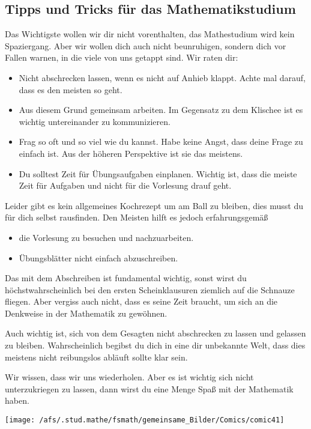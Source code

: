 \subsection{Tipps und Tricks für das Mathematikstudium}
Das Wichtigste wollen wir dir nicht vorenthalten,
das Mathestudium wird kein Spaziergang.
Aber wir wollen dich auch nicht beunruhigen,
sondern dich vor Fallen warnen, in die viele von uns getappt sind.
Wir raten dir:
\begin{itemize}
\item
Nicht abschrecken lassen, wenn es nicht auf Anhieb klappt.
Achte mal darauf, dass es den meisten so geht.

\item
Aus diesem Grund gemeinsam arbeiten.
Im Gegensatz zu dem Klischee ist es wichtig untereinander zu kommunizieren.

\item
Frag so oft und so viel wie du kannst.
Habe keine Angst, dass deine Frage zu einfach ist.
Aus der höheren Perspektive ist sie das meistens.

\item
Du solltest Zeit für Übungsaufgaben einplanen.
Wichtig ist, dass die meiste Zeit für Aufgaben und nicht für die
Vorlesung drauf geht.
\end{itemize}
Leider gibt es kein allgemeines Kochrezept um am Ball zu bleiben,
dies musst du für dich selbst rausfinden.
Den Meisten hilft es jedoch erfahrungsgemäß
\begin{itemize}
\item
die Vorlesung zu besuchen und nachzuarbeiten.
\item
Übungsblätter nicht einfach abzuschreiben.
\end{itemize}
Das mit dem Abschreiben ist fundamental wichtig,
sonst wirst du höchstwahrscheinlich bei den ersten Scheinklausuren
ziemlich auf die Schnauze fliegen.
Aber vergiss auch nicht,
dass es seine Zeit braucht,
um sich an die Denkweise in der Mathematik zu gewöhnen.

Auch wichtig ist,
sich von dem Gesagten nicht abschrecken zu lassen und gelassen zu bleiben.
Wahrscheinlich begibst du dich in eine dir unbekannte Welt,
dass dies meistens nicht reibungslos abläuft sollte klar sein.

Wir wissen, dass wir uns wiederholen.
Aber es ist wichtig sich nicht unterzukriegen zu lassen,
dann wirst du eine Menge Spaß mit der Mathematik haben.
  
\newpage
\vspace*{4cm}
{

}
{
\begin{center}
  \texttt{[image: /afs/.stud.mathe/fsmath/gemeinsame\_Bilder/Comics/comic41]}
\end{center}
}
\newpage

